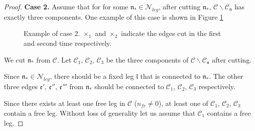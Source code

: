 \begin{proof}
    \textbf{Case 2.} Assume that for for some $\mathfrak{n}_*\in \mathcal{N}_{leg}$, after cutting $\mathfrak{n}_*$, $\mathcal{C}\backslash \mathcal{C}_{\mathfrak{n}}$ has exactly three components. One example of this case is shown in Figure \ref{fig.examplecase2.fourwave}
    \begin{figure}[H]
     \centering
     \caption{Example of case 2. $\times_1$ and $\times_2$ indicate the edges cut in the first and second time respectively.}
     \label{fig.examplecase2.fourwave}
    \end{figure}
    
    We cut $\mathfrak{n}_*$ from $\mathcal{C}$. Let $\mathcal{C}_1$, $\mathcal{C}_2$, $\mathcal{C}_3$ be the three components of $\mathcal{C}\backslash \mathcal{C}_{\mathfrak{n}}$ after cutting.
    
    Since $\mathfrak{n}_*\in \mathcal{N}_{leg}$, there should be a fixed leg $\mathfrak{l}$ that is connected to $\mathfrak{n}_*$. The other three edges $\mathfrak{e}'$, $\mathfrak{e}''$, $\mathfrak{e}'''$ from $\mathfrak{n}_*$ should be connected to $\mathcal{C}_1$, $\mathcal{C}_2$, $\mathcal{C}_3$ respectively. 
    
    Since there exists at least one free leg in $\mathcal{C}$ ($n_{\textit{fr}}\ne 0$), at least one of $\mathcal{C}_1$, $\mathcal{C}_2$, $\mathcal{C}_3$ contain a free leg. Without loss of generality let us assume that $\mathcal{C}_1$ contains a free leg.
    

\end{proof}
